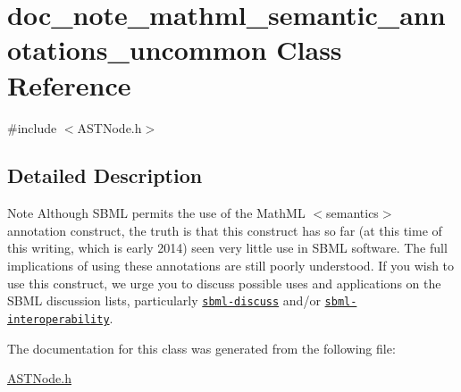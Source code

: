 \hypertarget{classdoc__note__mathml__semantic__annotations__uncommon}{}\section{doc\+\_\+note\+\_\+mathml\+\_\+semantic\+\_\+annotations\+\_\+uncommon Class Reference}
\label{classdoc__note__mathml__semantic__annotations__uncommon}


{\ttfamily \#include $<$A\+S\+T\+Node.\+h$>$}



\subsection{Detailed Description}
\begin{DoxyNote}{Note}
Although S\+B\+ML permits the use of the Math\+ML {\ttfamily $<$semantics$>$} annotation construct, the truth is that this construct has so far (at this time of this writing, which is early 2014) seen very little use in S\+B\+ML software. The full implications of using these annotations are still poorly understood. If you wish to use this construct, we urge you to discuss possible uses and applications on the S\+B\+ML discussion lists, particularly \href{http://sbml.org/Forums}{\tt sbml-\/discuss} and/or \href{http://sbml.org/Forums}{\tt sbml-\/interoperability}. 
\end{DoxyNote}


The documentation for this class was generated from the following file\+:\begin{DoxyCompactItemize}
\item 
\hyperlink{_a_s_t_node_8h}{A\+S\+T\+Node.\+h}\end{DoxyCompactItemize}
